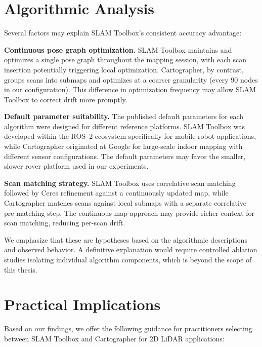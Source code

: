 \section{Algorithmic Analysis}

Several factors may explain SLAM Toolbox's consistent accuracy advantage:

\textbf{Continuous pose graph optimization.} SLAM Toolbox maintains and optimizes a single pose graph throughout the mapping session, with each scan insertion potentially triggering local optimization. Cartographer, by contrast, groups scans into submaps and optimizes at a coarser granularity (every 90 nodes in our configuration). This difference in optimization frequency may allow SLAM Toolbox to correct drift more promptly.

\textbf{Default parameter suitability.} The published default parameters for each algorithm were designed for different reference platforms. SLAM Toolbox was developed within the ROS~2 ecosystem specifically for mobile robot applications, while Cartographer originated at Google for large-scale indoor mapping with different sensor configurations. The default parameters may favor the smaller, slower rover platform used in our experiments.

\textbf{Scan matching strategy.} SLAM Toolbox uses correlative scan matching followed by Ceres refinement against a continuously updated map, while Cartographer matches scans against local submaps with a separate correlative pre-matching step. The continuous map approach may provide richer context for scan matching, reducing per-scan drift.

We emphasize that these are hypotheses based on the algorithmic descriptions and observed behavior. A definitive explanation would require controlled ablation studies isolating individual algorithm components, which is beyond the scope of this thesis.

\section{Practical Implications}

Based on our findings, we offer the following guidance for practitioners selecting between SLAM Toolbox and Cartographer for 2D LiDAR applications:

